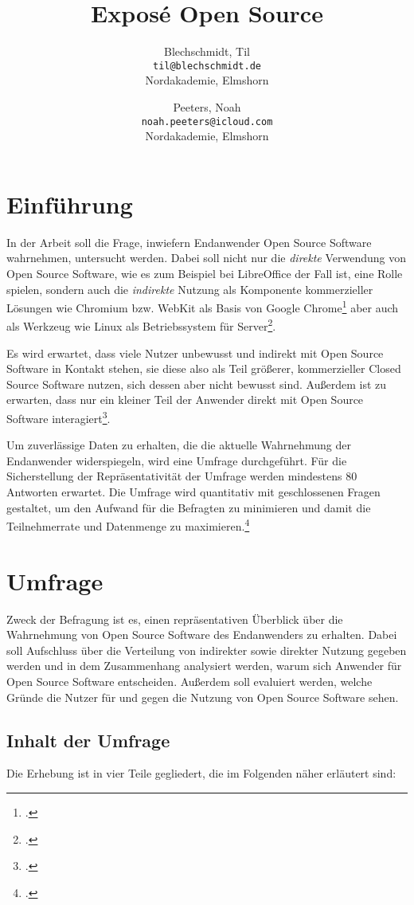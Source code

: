 \documentclass[a4paper]{article}
\title{Exposé Open Source}
\author{
  Blechschmidt, Til\\
  \texttt{til@blechschmidt.de}\\
  Nordakademie, Elmshorn
  \and
  Peeters, Noah\\
  \texttt{noah.peeters@icloud.com}\\
  Nordakademie, Elmshorn
}
\begin{document}
	\maketitle
	
	\section{Einführung}
		In der Arbeit soll die Frage, inwiefern Endanwender Open Source Software wahrnehmen, untersucht werden. Dabei soll nicht nur die \emph{direkte} Verwendung von Open Source Software, wie es zum Beispiel bei LibreOffice der Fall ist, eine Rolle spielen, sondern auch die \emph{indirekte} Nutzung als Komponente kommerzieller Lösungen wie Chromium bzw. WebKit als Basis von Google Chrome\footcite{is:open:source:right:for:you} aber auch als Werkzeug wie Linux als Betriebssystem für Server\footcite{report:BaselineScenario}.
		
		Es wird erwartet, dass viele Nutzer unbewusst und indirekt mit Open Source Software in Kontakt stehen, sie diese also als Teil größerer, kommerzieller Closed Source Software nutzen, sich dessen aber nicht bewusst sind. Außerdem ist zu erwarten, dass nur ein kleiner Teil der Anwender direkt mit Open Source Software interagiert\footcite{oss:lotus-to-linux}.
		
		Um zuverlässige Daten zu erhalten, die die aktuelle Wahrnehmung der Endanwender widerspiegeln, wird eine Umfrage durchgeführt. Für die Sicherstellung der Repräsentativität der Umfrage werden mindestens 80 Antworten erwartet.
		Die Umfrage wird quantitativ mit geschlossenen Fragen gestaltet, um den Aufwand für die Befragten zu minimieren und damit die Teilnehmerrate und Datenmenge zu maximieren.\footcite{handbuch:methoden}
	
	\section{Umfrage}
		Zweck der Befragung ist es, einen repräsentativen Überblick über die Wahrnehmung von Open Source Software des Endanwenders zu erhalten. Dabei soll Aufschluss über die Verteilung von indirekter sowie direkter Nutzung gegeben werden und in dem Zusammenhang analysiert werden, warum sich Anwender für Open Source Software entscheiden. Außerdem soll evaluiert werden, welche Gründe die Nutzer für und gegen die Nutzung von Open Source Software sehen.
	
		\subsection{Inhalt der Umfrage}
			Die Erhebung ist in vier Teile gegliedert, die im Folgenden näher erläutert sind: 
		   
\end{document}
